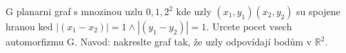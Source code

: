 G planarni graf s mnozinou uzlu ${0,1,2}^2$ kde uzly $(x_1, y_1)
(x_2, y_2)$ su spojene hranou ked $|(x_1 - x_2)| = 1 \land |(y_1 -
y_2)| = 1$. Urcete pocet vsech automorfizmu G. Navod: nakreslte graf tak, že
uzly odpovídají bodům v $\mathbb{R}^{2}$.

